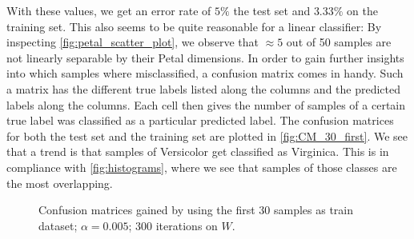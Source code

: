 \documentclass{article}
\begin{document}
With these values, we get an error rate of $5\%$ the test set and $3.33\%$ on the training set. This
also seems to be quite reasonable for a linear classifier: By inspecting \autoref{fig:petal_scatter_plot},
we observe that $\approx 5$ out of 50 samples are not linearly separable by their Petal dimensions.
In order to gain further insights into which samples where misclassified, a confusion matrix comes in
handy. Such a matrix has the different true labels listed along the columns and the predicted labels
along the columns. Each cell then gives the number of samples of a certain true label was classified
as a particular predicted label. The confusion matrices for both the test set and the training set are
plotted in \autoref{fig:CM_30_first}. We see that a trend is that samples of Versicolor get classified
as Virginica. This is in compliance with \autoref{fig:histograms}, where we see that samples of
those classes are the most overlapping.

\begin{figure}
    \centering
    \qquad
    \caption{Confusion matrices gained by using the first 30 samples as train dataset;%
    $\alpha = 0.005$; 300 iterations on $W$.}\label{fig:CM_30_first}
\end{figure}
\end{document}
